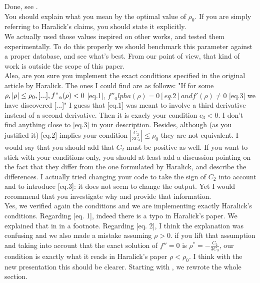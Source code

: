 \documentclass[a4paper,10pt]{report}
\begin{document}
\ans Done, see .\\

\que You should explain what you mean by the optimal value of $\rho_0$. If you are
simply referring to Haralick's claims, you should state it explicitly.\\

\ans We actually used those values inspired on other works, and tested them experimentally. To do this properly we should benchmark this parameter against a proper database, and see what's best. From our point of view, that kind of work is outside the scope of this paper.\\

\que Also, are you sure you implement the exact conditions specified in the
original article by Haralick. The ones I could find are as follows:
"If for some $\rho, |\rho|\leq\rho_0, [...], f"_\alpha(\rho)<0$ [eq.1],
$f''_alpha(\rho)=0 [eq.2] and f'(\rho)\neq 0$ [eq.3] we have discovered [...]"
I guess that [eq.1] was meant to involve a third derivative instead of a second
derivative. Then it is exacly your condition $c_3<0$. I don't find anything
close to [eq.3] in your description. Besides, although (as you justified it)
[eq.2] implies your condition $|\frac{C_2}{3C_3}|\leq\rho_0$ they are not
equivalent. I would say that you should add that $C_2$ must be positive as well. If you want to stick with your conditions only, you should at least add a discussion pointing on the fact that they differ from the one formulated by Haralick, and
describe the differences. I actually tried changing your code to take the
sign of $C_2$ into account and to introduce [eq.3]: it does not seem to change
the output. Yet I would recommend that you investigate why and provide that
information.\\

\ans Yes, we verified again the conditions and we are implementing exactly Haralick's conditions. Regarding [eq. 1], indeed there is a typo in Haralick's paper. We explained that in  in a footnote.
Regarding [eq. 2], I think the explanation was confusing and we also made a mistake assuming $\rho>0$. if you lift that assumption and taking into account that the exact solution of $f''=0$ is $\rho^*=-\frac{C_2}{3C_3}$, our condition is exactly what it reads in Haralick's paper $\rho<\rho_0$. I think with the new presentation this should be clearer. Starting with , we rewrote the whole section.\\
\end{document}
